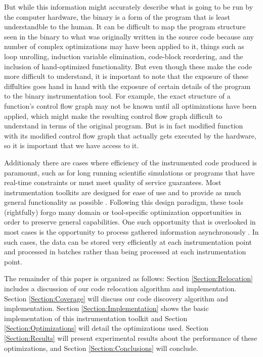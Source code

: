 But while this information might accurately describe what is going to be run by the computer hardware, the
binary is a form of the program that is least understandble to the human. It can be difficult to map the
program structure seen in the binary to what was originally written in the source code because any number of
complex optimizations may have been applied to it, things such as loop unrolling, induction variable 
elimination, code-block reordering, and the inclusion of hand-optimized functionality. But even though these
make the code more difficult to understand, it is important to note that the exposure of these diffulties
goes hand in hand with the exposure of certain details of the program to the binary instrumentation tool. For example, the exact structure
of a function's control flow graph may not be known until all optimizations have been applied, which might
make the resulting control flow graph difficult to understand in terms of the original program. But is in fact
modified function with its modified control flow graph that actually gets executed by the hardware, so it is
important that we have access to it.

Additionaly there are cases where efficiency of the instrumented code produced is paramount, such as for long running scientific simulations or programs that have
real-time constraints or must meet quality of service guarantees. Most instrumentation toolkits are designed for ease
of use and to provide as much general functionality as possible \cite{nethercote2007valgrind}. Following this design paradigm, these tools (rightfully) forgo
many domain or tool-specific optimization opportunities in order to preserve general capabilities. One such opportunity that
is overlooked in most cases is the opportunity to process gathered information asynchronously \cite{gao2005aliter}. In such
cases, the data can be stored very efficiently at each instrumentation point and processed in batches rather than being processed
at each instrumentation point. 

The remainder of this paper is organized as follows: Section \ref{Section:Relocation} includes a discussion
of our code relocation algorithm and implementation. Section \ref{Section:Coverage} will discuss our code discovery
algorithm and implementation.
Section \ref{Section:Implementation} shows the basic implementation of
this instrumentation toolkit and Section \ref{Section:Optimizations} will detail the 
optimizations used. Section \ref{Section:Results} will present experimental results about the
performance of these optimizations, and Section \ref{Section:Conclusions} will conclude. 

